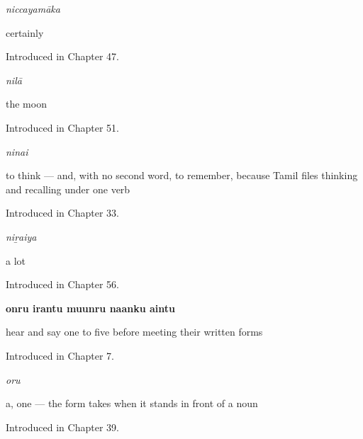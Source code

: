 \noindent\begin{minipage}[t]{\linewidth}
\raggedright
\textbf{}\enspace\emph{niccayamāka}\par
\small certainly\par
\footnotesize Introduced in Chapter 47.
\end{minipage}\par\medskip

\noindent\begin{minipage}[t]{\linewidth}
\raggedright
\textbf{}\enspace\emph{nilā}\par
\small the moon\par
\footnotesize Introduced in Chapter 51.
\end{minipage}\par\medskip

\noindent\begin{minipage}[t]{\linewidth}
\raggedright
\textbf{}\enspace\emph{ninai}\par
\small to think — and, with no second word, to remember, because Tamil files thinking and recalling under one verb\par
\footnotesize Introduced in Chapter 33.
\end{minipage}\par\medskip

\noindent\begin{minipage}[t]{\linewidth}
\raggedright
\textbf{}\enspace\emph{niṟaiya}\par
\small a lot\par
\footnotesize Introduced in Chapter 56.
\end{minipage}\par\medskip

\noindent\begin{minipage}[t]{\linewidth}
\raggedright
\textbf{onru irantu muunru naanku aintu}\par
\small hear and say one to five before meeting their written forms\par
\footnotesize Introduced in Chapter 7.
\end{minipage}\par\medskip

\noindent\begin{minipage}[t]{\linewidth}
\raggedright
\textbf{}\enspace\emph{oru}\par
\small a, one — the form  takes when it stands in front of a noun\par
\footnotesize Introduced in Chapter 39.
\end{minipage}\par\medskip

